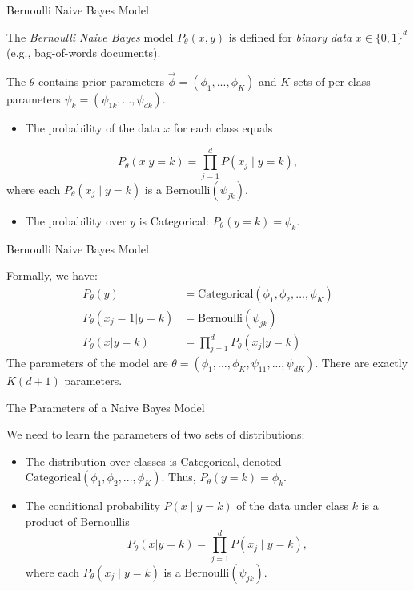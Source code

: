 \documentclass[../../generative_classifiers.tex]{subfiles}
\begin{document}
\begin{frame}[fragile]{Bernoulli Naive Bayes Model}



The \textit{Bernoulli Naive Bayes} model $P_\theta(x,y)$ is defined for \textit{binary data} $x \in \{0,1\}^d$ (e.g., bag-of-words documents).

\vspace{0.2cm}


The $\theta$ contains prior parameters $\vec\phi = (\phi_1,...,\phi_K)$ and $K$ sets of per-class parameters $\psi_k = (\psi_{1k},...,\psi_{dk})$.

\vspace{0.2cm}

\begin{itemize}
    \item The probability of the data $x$ for each class equals
\end{itemize}
$$P_\theta(x|y=k) = \prod_{j=1}^d P(x_j \mid y=k),$$
where each $P_\theta(x_j \mid y=k)$ is a $\text{Bernoulli}(\psi_{jk})$.

\vspace{0.2cm}

\begin{itemize}
    \item The probability over $y$ is Categorical: $P_\theta(y=k) = \phi_k$.
\end{itemize}

\end{frame}

\begin{frame}[fragile]{Bernoulli Naive Bayes Model}

Formally, we have:
\begin{align*}
P_\theta(y) & = \text{Categorical}(\phi_1,\phi_2,\ldots,\phi_K) \\
P_\theta(x_j=1|y=k) & = \text{Bernoulli}(\psi_{jk}) \\
P_\theta(x|y=k) & = \prod_{j=1}^d P_\theta(x_j|y=k)
\end{align*}
The parameters of the model are $\theta = (\phi_1,...,\phi_K, \psi_{11}, ...,\psi_{dK})$.
There are exactly $K(d+1)$ parameters.
\end{frame}


\begin{frame}[fragile]{The Parameters of a Naive Bayes Model}

We need to learn the parameters of two sets of distributions:
 \begin{itemize}
     \item The distribution over classes is Categorical, denoted $\text{Categorical}(\phi_1, \phi_2, ..., \phi_K)$. Thus, $P_\theta(y=k) = \phi_k$.
     \item The conditional probability $P(x\mid y=k)$ of the data under class $k$ is a product of Bernoullis $$P_\theta(x|y=k) = \prod_{j=1}^d P(x_j \mid y=k),$$ where each $P_\theta(x_j \mid y=k)$ is a $\text{Bernoulli}(\psi_{jk})$.
 \end{itemize}
\end{frame}
\end{document}
